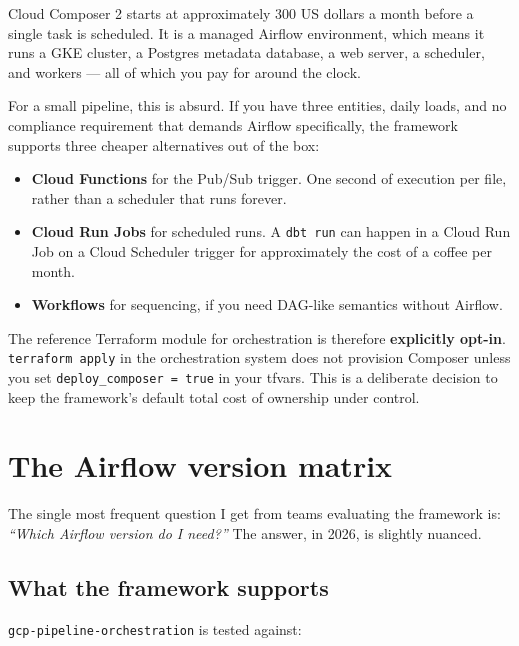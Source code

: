 \documentclass[
  11pt,
  british,
  oneside]{book}
\providecommand{\tightlist}{%
  \setlength{\itemsep}{0pt}\setlength{\parskip}{0pt}}
\begin{document}
Cloud Composer 2 starts at approximately 300 US dollars a month before a
single task is scheduled. It is a managed Airflow environment, which
means it runs a GKE cluster, a Postgres metadata database, a web server,
a scheduler, and workers --- all of which you pay for around the clock.

For a small pipeline, this is absurd. If you have three entities, daily
loads, and no compliance requirement that demands Airflow specifically,
the framework supports three cheaper alternatives out of the box:

\begin{itemize}
\tightlist
\item
  \textbf{Cloud Functions} for the Pub/Sub trigger. One second of
  execution per file, rather than a scheduler that runs forever.
\item
  \textbf{Cloud Run Jobs} for scheduled runs. A \texttt{dbt\ run} can
  happen in a Cloud Run Job on a Cloud Scheduler trigger for
  approximately the cost of a coffee per month.
\item
  \textbf{Workflows} for sequencing, if you need DAG-like semantics
  without Airflow.
\end{itemize}

The reference Terraform module for orchestration is therefore
\textbf{explicitly opt-in}. \texttt{terraform\ apply} in the
orchestration system does not provision Composer unless you set
\texttt{deploy\_composer\ =\ true} in your tfvars. This is a deliberate
decision to keep the framework's default total cost of ownership under
control.

\hypertarget{the-airflow-version-matrix}{%
\section{The Airflow version matrix}\label{the-airflow-version-matrix}}

The single most frequent question I get from teams evaluating the
framework is: \emph{``Which Airflow version do I need?''} The answer, in
2026, is slightly nuanced.

\hypertarget{what-the-framework-supports}{%
\subsection{What the framework
supports}\label{what-the-framework-supports}}

\texttt{gcp-pipeline-orchestration} is tested against:
\end{document}
